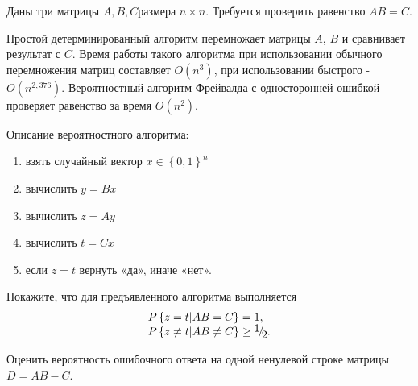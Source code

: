 \begin{problem}

Даны три матрицы $A,B,C$размера $n\times n$. Требуется проверить равенство $AB=C$.

Простой детерминированный алгоритм перемножает матрицы $A$, $B$ и сравнивает результат с $C$. Время работы такого алгоритма при использовании обычного перемножения матриц составляет $O(n^{3} )$, при использовании быстрого - $O(n^{2,376} )$. Вероятностный алгоритм Фрейвалда с односторонней ошибкой проверяет равенство за время $O(n^{2} )$.

Описание вероятностного алгоритма:

\begin{enumerate}
\item \textbf{ }взять случайный вектор $x\in \left\{0,1\right\}^{n} $

\item  вычислить $y=Bx$

\item  вычислить $z=Ay$

\item  вычислить $t=Cx$

\item  если $z=t$ вернуть «да», иначе «нет».
\end{enumerate}

Покажите, что для предъявленного алгоритма выполняется 
\[\begin{array}{l} {P\left\{z=t \vert AB=C\right\}=1,} \\ {P\left\{z \neq t \vert AB\ne C\right\}\ge {\raise0.7ex\hbox{$ 1 $}\!\mathord{\left/ {\vphantom {1 2}} \right. \kern-\nulldelimiterspace}\!\lower0.7ex\hbox{$ 2 $}} .} \end{array}\] 

\begin{ordre}
Оценить вероятность ошибочного ответа на одной ненулевой строке матрицы $D = AB - C$. 
\end{ordre}

\end{problem}

